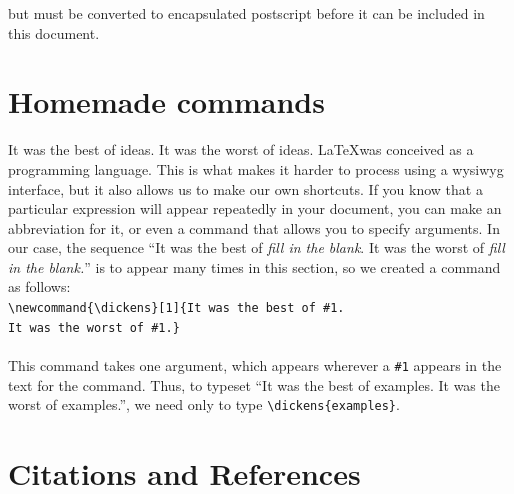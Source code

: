 \documentclass[12pt]{article}
\begin{document}
\noindent but must be converted to encapsulated postscript before it can be included in this document.

\section{Homemade commands}

It was the best of ideas. It was the worst of ideas. \LaTeX was conceived as a programming language. This is what makes it harder to process using a wysiwyg interface, but it also allows us to make our own shortcuts. If you know that a particular expression will appear repeatedly in your document, you can make an abbreviation for it, or even a command that allows you to specify arguments. In our case, the sequence “It was the best of \textit{fill in the blank}. It was the worst of \textit{fill in the blank.}” is to appear many times in this section, so we created a command as follows:\\

\noindent \verb|\newcommand{\dickens}[1]{It was the best of #1.|\\
\verb|It was the worst of #1.}|
\\\\
\noindent This command takes one argument, which appears wherever a \verb|#1| appears in the text for the command. Thus, to typeset ``It was the best of examples. It was the worst of examples.'', we need only to type \verb|\dickens{examples}|.

\section{Citations and References}
\end{document}
